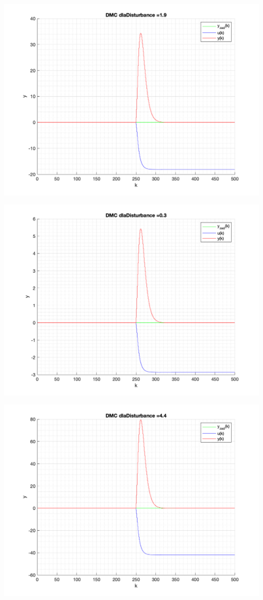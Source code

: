 \documentclass[a4paper, 11pt]{article}
\begin{document}
\begin{enumerate}
 \includegraphics[width=\linewidth]{./ModelsP4_Disturbance/P4_DMC_Disturbance_1_9_png.png} 
 
 \includegraphics[width=\linewidth]{./ModelsP4_Disturbance/P4_DMC_Disturbance_0_3_png.png} 
 
 \includegraphics[width=\linewidth]{./ModelsP4_Disturbance/P4_DMC_Disturbance_4_4_png.png} 
 

\end{enumerate}
\end{document}
